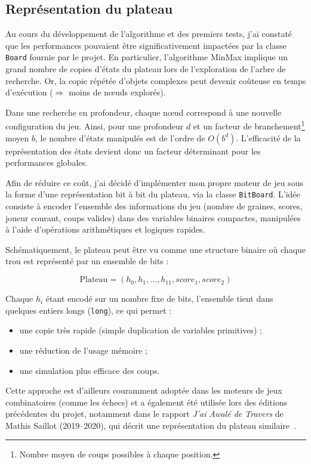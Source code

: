 \documentclass[11pt,a4paper]{article}
\begin{document}
\subsection{Représentation du plateau}

Au cours du développement de l'algorithme et des premiers tests, j'ai constaté que les performances pouvaient être
significativement impactées par la classe \texttt{Board} fournie par le projet. En particulier, l'algorithme MinMax implique
un grand nombre de copies d'états du plateau lors de l'exploration de l'arbre de recherche. Or, la copie répétée d'objets
complexes peut devenir coûteuse en temps d'exécution ($\Rightarrow$ moins de nœuds explorés).

Dans une recherche en profondeur, chaque nœud correspond à une nouvelle configuration du jeu. Ainsi, pour une profondeur $d$ et
un facteur de branchement\footnote{Nombre moyen de coups possibles à chaque position.} moyen $b$, le nombre d'états manipulés est de l'ordre de $O(b^d)$. L'efficacité de la représentation
des états devient donc un facteur déterminant pour les performances globales.

Afin de réduire ce coût, j'ai décidé d'implémenter mon propre moteur de jeu sous la forme d'une représentation bit à bit du
plateau, via la classe \texttt{BitBoard}. L'idée consiste à encoder l'ensemble des informations du jeu (nombre de graines,
scores, joueur courant, coups valides) dans des variables binaires compactes, manipulées à l'aide d'opérations arithmétiques
et logiques rapides.

Schématiquement, le plateau peut être vu comme une structure binaire où chaque trou est représenté par un ensemble de bits :

\[
\text{Plateau} = (h_0, h_1, \dots, h_{11}, score_1, score_2)
\]

Chaque $h_i$ étant encodé sur un nombre fixe de bits, l'ensemble tient dans quelques entiers longs (\texttt{long}), ce qui permet :

\begin{itemize}
  \item une copie très rapide (simple duplication de variables primitives) ;
  \item une réduction de l'usage mémoire ;
  \item une simulation plus efficace des coups.
\end{itemize}

Cette approche est d'ailleurs couramment adoptée dans les moteurs de jeux combinatoires (comme les échecs) et a également été
utilisée lors des éditions précédentes du projet, notamment dans le rapport \textit{J’ai Awalé de Travers} de Mathis Saillot
(2019--2020), qui décrit une représentation du plateau similaire~\cite{Saillot2020}.
\end{document}
